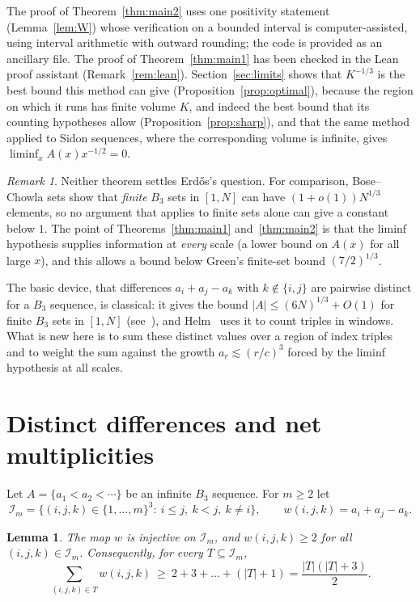 \documentclass[11pt]{amsart}
\newtheorem{lemma}{Lemma}
\theoremstyle{remark}
\newtheorem{remark}{Remark}
\newcommand{\I}{\mathcal{I}}
\begin{document}
The proof of Theorem~\ref{thm:main2} uses one positivity statement (Lemma~\ref{lem:W}) whose verification on a bounded interval is computer-assisted, using interval arithmetic with outward rounding; the code is provided as an ancillary file. The proof of Theorem~\ref{thm:main1} has been checked in the Lean proof assistant (Remark~\ref{rem:lean}). Section~\ref{sec:limits} shows that $K^{-1/3}$ is the best bound this method can give (Proposition~\ref{prop:optimal}), because the region on which it runs has finite volume $K$, and indeed the best bound that its counting hypotheses allow (Proposition~\ref{prop:sharp}), and that the same method applied to Sidon sequences, where the corresponding volume is infinite, gives $\liminf_xA(x)x^{-1/2}=0$.

\begin{remark}
Neither theorem settles Erd\H{o}s's question. For comparison, Bose--Chowla sets show that \emph{finite} $B_3$ sets in $[1,N]$ can have $(1+o(1))N^{1/3}$ elements, so no argument that applies to finite sets alone can give a constant below $1$. The point of Theorems~\ref{thm:main1} and~\ref{thm:main2} is that the liminf hypothesis supplies information at \emph{every} scale (a lower bound on $A(x)$ for all large $x$), and this allows a bound below Green's finite-set bound $(7/2)^{1/3}$.
\end{remark}

The basic device, that differences $a_i+a_j-a_k$ with $k\notin\{i,j\}$ are pairwise distinct for a $B_3$ sequence, is classical: it gives the bound $|A|\le(6N)^{1/3}+O(1)$ for finite $B_3$ sets in $[1,N]$ (see~\cite[\S6]{Graham}), and Helm~\cite[Lemma~1]{Helm96} uses it to count triples in windows. What is new here is to sum these distinct values over a region of index triples and to weight the sum against the growth $a_r\lesssim(r/c)^3$ forced by the liminf hypothesis at all scales.

\section{Distinct differences and net multiplicities}

Let $A=\{a_1<a_2<\cdots\}$ be an infinite $B_3$ sequence. For $m\ge2$ let
\[
\I_m=\{(i,j,k)\in\{1,\dots,m\}^3:\ i\le j,\ k<j,\ k\ne i\},
\qquad
w(i,j,k)=a_i+a_j-a_k .
\]

\begin{lemma}\label{lem:A}
The map $w$ is injective on $\I_m$, and $w(i,j,k)\ge2$ for all $(i,j,k)\in\I_m$. Consequently, for every $T\subseteq\I_m$,
\begin{equation}\label{eq:star}
\sum_{(i,j,k)\in T}w(i,j,k)\ \ge\ 2+3+\dots+(|T|+1)=\frac{|T|(|T|+3)}{2}.
\end{equation}
\end{lemma}
\end{document}
